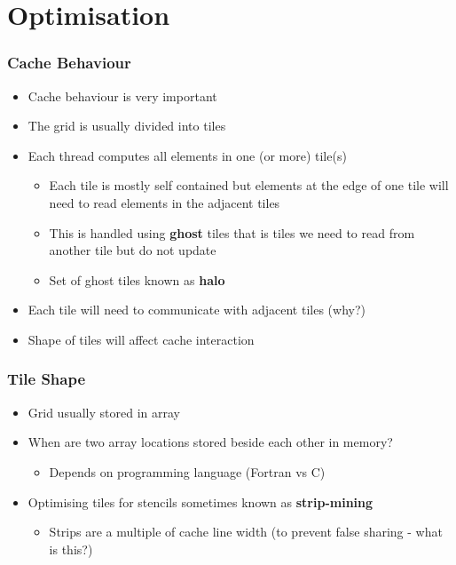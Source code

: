 \documentclass{beamer}
\begin{document}
\section{Optimisation}
\begin{frame}
	\frametitle{Cache Behaviour}
\begin{itemize}
	\item Cache behaviour is very important
	\item The grid is usually divided into tiles
	\item Each thread computes all elements in one (or more) tile(s)
	\begin{itemize}
		\item Each tile is mostly self contained but elements at the edge of one tile will need to read elements in the adjacent tiles
		\item This is handled using \textbf{ghost} tiles that is tiles we need to read from another tile but do not update
		\item Set of ghost tiles known as \textbf{halo}
	\end{itemize}
	\item Each tile will need to communicate with adjacent tiles (why?)
	\item Shape of tiles will affect cache interaction
\end{itemize}
\end{frame}
 
 \begin{frame}
 	\frametitle{Tile Shape}
 	\begin{itemize}
 		\item Grid usually stored in array
 		\item When are two array locations stored beside each other in memory?
 		\begin{itemize}
 			\item Depends on programming language (Fortran vs C)
 		\end{itemize}
 		\item Optimising tiles for stencils sometimes known as \textbf{strip-mining}
 		 		\begin{itemize}
 		 			\item Strips are a multiple of cache line width (to prevent false sharing - what is this?)
 		 		\end{itemize}
 	\end{itemize}
 \end{frame}
\end{document}
